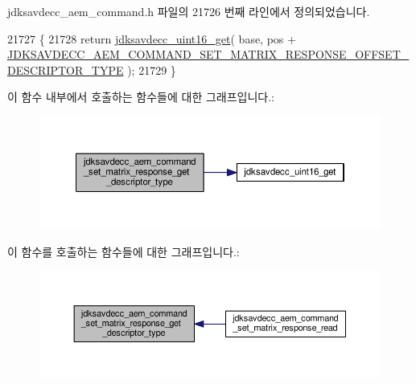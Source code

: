 jdksavdecc\+\_\+aem\+\_\+command.\+h 파일의 21726 번째 라인에서 정의되었습니다.


\begin{DoxyCode}
21727 \{
21728     \textcolor{keywordflow}{return} \hyperlink{group__endian_ga3fbbbc20be954aa61e039872965b0dc9}{jdksavdecc\_uint16\_get}( base, pos + 
      \hyperlink{group__command__set__matrix__response_gab7d18dbe7b67add857dffdf7ecf21846}{JDKSAVDECC\_AEM\_COMMAND\_SET\_MATRIX\_RESPONSE\_OFFSET\_DESCRIPTOR\_TYPE}
       );
21729 \}
\end{DoxyCode}


이 함수 내부에서 호출하는 함수들에 대한 그래프입니다.\+:
\nopagebreak
\begin{figure}[H]
\begin{center}
\leavevmode
\includegraphics[width=350pt]{group__command__set__matrix__response_gaaaaefffb49fea0ed3079d21a5fc05690_cgraph}
\end{center}
\end{figure}




이 함수를 호출하는 함수들에 대한 그래프입니다.\+:
\nopagebreak
\begin{figure}[H]
\begin{center}
\leavevmode
\includegraphics[width=350pt]{group__command__set__matrix__response_gaaaaefffb49fea0ed3079d21a5fc05690_icgraph}
\end{center}
\end{figure}


